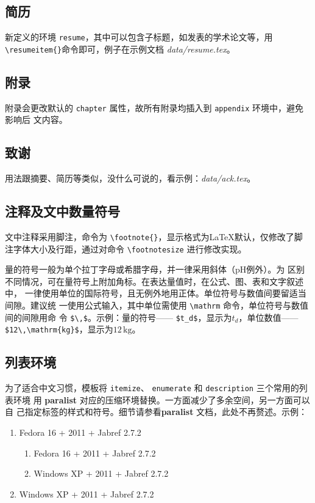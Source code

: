 \subsection*{简历}

新定义的环境 \texttt{resume}，其中可以包含子标题，如发表的学术论文等，用
\verb|\resumeitem{}|命令即可，例子在示例文档 \emph{data/resume.tex}。

\subsection*{附录}

附录会更改默认的 \texttt{chapter} 属性，故所有附录均插入到 \texttt{appendix} 环境中，避免影响后
文内容。
\begin{code}
\begin{appendix}
 
 
\end{appendix}
\end{code}

\subsection*{致谢}

用法跟摘要、简历等类似，没什么可说的，看示例：\emph{data/ack.tex}。

\subsection*{注释及文中数量符号}

文中注释采用脚注，命令为 \verb|\footnote{}|，显示格式为\LaTeX{}默认，仅修改了脚
注字体大小及行距，通过对命令 \verb|\footnotesize| 进行修改实现。

量的符号一般为单个拉丁字母或希腊字母，并一律采用斜体（$\mathrm{pH}$例外）。为
区别不同情况，可在量符号上附加角标。在表达量值时，在公式、图、表和文字叙述中，
一律使用单位的国际符号，且无例外地用正体。单位符号与数值间要留适当间隙。建议统
一使用公式输入，其中单位需使用 \verb|\mathrm| 命令，单位符号与数值间的间隙用命
令 \verb|$\,$|。示例：量的符号—— \verb|$t_d$|，显示为$t_d$，单位数值——
\verb|$12\,\mathrm{kg}$|，显示为$12\,\mathrm{kg}$。

\subsection*{列表环境}

为了适合中文习惯，模板将 \texttt{itemize}、 \texttt{enumerate} 和
\texttt{description} 三个常用的列表环境
用 \textbf{paralist} 对应的压缩环境替换。一方面减少了多余空间，另一方面可以自
己指定标签的样式和符号。细节请参看\textbf{paralist} 文档，此处不再赘述。示例：
\begin{enumerate}
\item Fedora 16 + \TeXLive{} 2011 + Jabref 2.7.2
  \begin{enumerate}
    \item Fedora 16 + \TeXLive{} 2011 + Jabref 2.7.2
    \item Windows XP + \TeXLive{} 2011 + Jabref 2.7.2
  \end{enumerate}
\item Windows XP + \TeXLive{} 2011 + Jabref 2.7.2
\end{enumerate}
